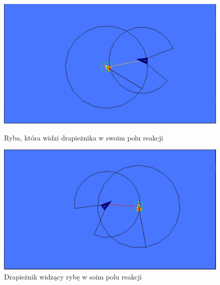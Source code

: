 \documentclass{article}
\begin{document}
\begin{figure}[H]
    \begin{minipage}{0.48\textwidth}
        \centering
        \includegraphics[width=\textwidth]{9_Fish_seeing_predator.jpg}
        \caption{Ryba, która widzi drapieżnika w swoim polu reakcji}
    \end{minipage}
    \hspace{0.02\textwidth}
    \begin{minipage}{0.48\textwidth}
        \centering
        \includegraphics[width=\textwidth]{10_Predator_seeing_fish.jpg}
        \caption{Drapieżnik widzący rybę w soim polu reakcji}
    \end{minipage}
\end{figure}
\end{document}
